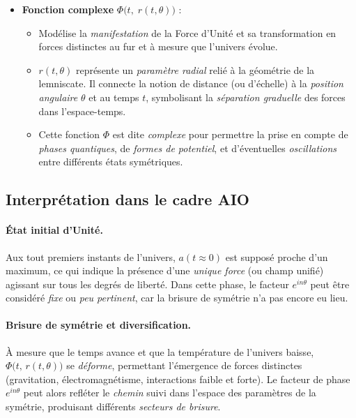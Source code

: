 \documentclass[12pt]{article}
\begin{document}
\begin{itemize}
    \item \textbf{Fonction complexe} $\Phi\bigl(t,\;r(t,\theta)\bigr)$ :
    \begin{itemize}
        \item Modélise la \emph{manifestation} de la Force d'Unité et sa transformation 
              en forces distinctes au fur et à mesure que l'univers évolue.
        \item $r(t,\theta)$ représente un \emph{paramètre radial} relié à la géométrie 
              de la lemniscate. Il connecte la notion de distance (ou d’échelle) 
              à la \textit{position angulaire} $\theta$ et au temps $t$, 
              symbolisant la \textit{séparation graduelle} des forces dans l'espace-temps.
        \item Cette fonction $\Phi$ est dite \textit{complexe} pour permettre 
              la prise en compte de \emph{phases quantiques}, de \emph{formes de potentiel}, 
              et d’éventuelles \emph{oscillations} entre différents états symétriques.
    \end{itemize}
\end{itemize}

\subsection{Interprétation dans le cadre AIO}

\paragraph{État initial d'Unité.}
Aux tout premiers instants de l'univers, $a(t \approx 0)$ est supposé proche d'un maximum, 
ce qui indique la présence d'une \emph{unique force} (ou champ unifié) 
agissant sur tous les degrés de liberté. Dans cette phase, 
le facteur $e^{i n \theta}$ peut être considéré \emph{fixe} ou \emph{peu pertinent}, 
car la brisure de symétrie n'a pas encore eu lieu.

\paragraph{Brisure de symétrie et diversification.}
À mesure que le temps avance et que la température de l'univers baisse, 
$\Phi\bigl(t,\,r(t,\theta)\bigr)$ se \emph{déforme}, permettant l'émergence 
de forces distinctes (gravitation, électromagnétisme, interactions faible et forte). 
Le facteur de phase $e^{i n \theta}$ peut alors refléter le \emph{chemin} suivi 
dans l'espace des paramètres de la symétrie, produisant différents \textit{secteurs de brisure}.
\end{document}
